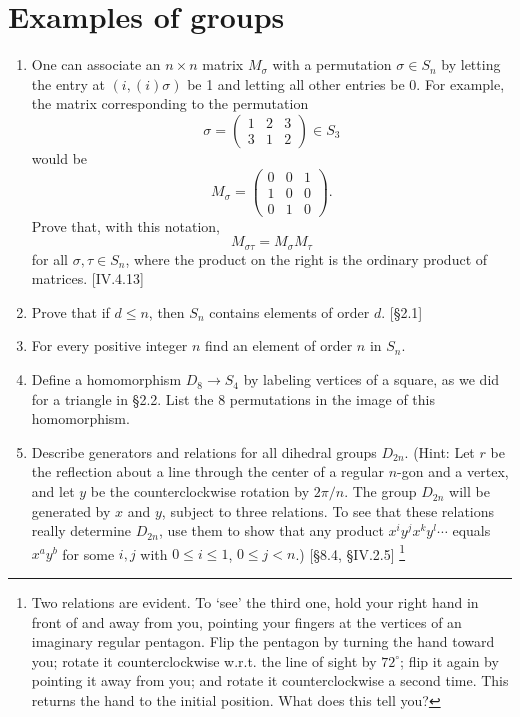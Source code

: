 \section{Examples of groups}
\begin{enumerate}
    \item One can associate an $n \times n$ matrix $M_\sigma$ with a permutation $\sigma \in S_n$ by letting the entry at $(i, (i)\sigma)$ be 1 and letting all other entries be 0. For example, the matrix corresponding to the permutation
          \[ \sigma = \begin{pmatrix} 1 & 2 & 3 \\ 3 & 1 & 2 \end{pmatrix} \in S_3 \]
          would be
          \[ M_\sigma = \begin{pmatrix} 0 & 0 & 1 \\ 1 & 0 & 0 \\ 0 & 1 & 0 \end{pmatrix}. \]
          Prove that, with this notation,
          \[ M_{\sigma\tau} = M_\sigma M_\tau \]
          for all $\sigma, \tau \in S_n$, where the product on the right is the ordinary product of matrices. [IV.4.13]

    \item Prove that if $d \le n$, then $S_n$ contains elements of order $d$. [\S2.1]

    \item For every positive integer $n$ find an element of order $n$ in $S_n$.

    \item Define a homomorphism $D_8 \to S_4$ by labeling vertices of a square, as we did for a triangle in \S2.2. List the 8 permutations in the image of this homomorphism.

    \item Describe generators and relations for all dihedral groups $D_{2n}$. (Hint: Let $r$ be the reflection about a line through the center of a regular $n$-gon and a vertex, and let $y$ be the counterclockwise rotation by $2\pi/n$. The group $D_{2n}$ will be generated by $x$ and $y$, subject to three relations\footnotemark. To see that these relations really determine $D_{2n}$, use them to show that any product $x^i y^j x^k y^l \cdots$ equals $x^a y^b$ for some $i, j$ with $0 \le i \le 1$, $0 \le j < n$.) [\S8.4, \S IV.2.5]
        \footnote{Two relations are evident. To ‘see’ the third one, hold your right hand in front of and
        away from you, pointing your fingers at the vertices of an imaginary regular pentagon. Flip the
        pentagon by turning the hand toward you; rotate it counterclockwise w.r.t. the line of sight by $72^\circ$; flip it again by pointing it away from you; and rotate it counterclockwise a second time. This
returns the hand to the initial position. What does this tell you?}


\end{enumerate}
